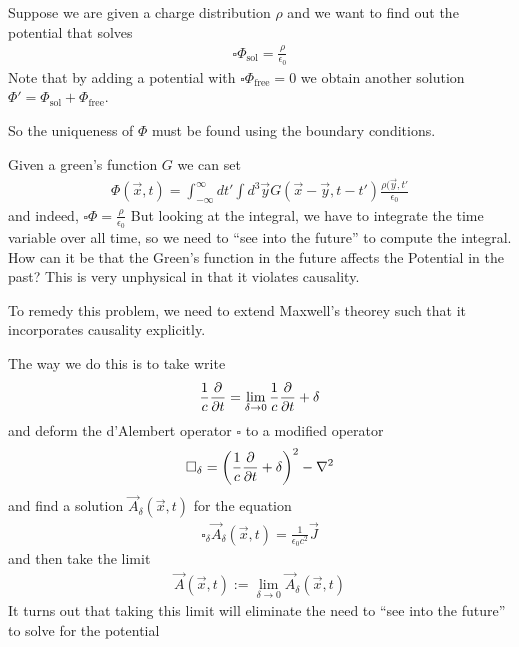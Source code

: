Suppose we are given a charge distribution $\rho$ and we want to find out the potential that solves
\begin{align*}
  \square \Phi_{\text{sol}} = \frac{\rho}{\epsilon_0}
\end{align*}
Note that by adding a potential with $\square \Phi_{\text{free}} = 0$
we obtain another solution $\Phi' = \Phi_{\text{sol}} + \Phi_{\text{free}}$.

So the uniqueness of $\Phi$ must be found using the boundary conditions.

Given a green's function $G$ we can set
\begin{align*}
  \Phi(\vec{x},t) = 
  \int_{-\infty}^{\infty}
  dt' \int d^{3}\vec{y}G(\vec{x} -\vec{y}, t - t') \frac{\rho(\vec{y},t'}{\epsilon_0}
\end{align*}
and indeed, $\square \Phi = \frac{\rho}{\epsilon_0}$ 
But looking at the integral, we have to integrate the time variable over all time, so we need to ``see into the future'' to compute the integral.
How can it be that the Green's function in the future affects the Potential in the past?
This is very unphysical in that it violates causality.

To remedy this problem, we need to extend Maxwell's theorey such that it incorporates causality explicitly.

The way we do this is to take write
\begin{align*}
  \frac{1}{c} \frac{\partial }{\partial t} = \lim_{\delta \to 0}\frac{1}{c} \frac{\partial }{\partial t} + \delta
\end{align*}
and deform the d'Alembert operator $\square$ to a modified operator
\begin{align*}
  \square_{\delta} = \left(
    \frac{1}{c}\frac{\partial }{\partial t} + \delta
  \right)^{2}
  - \nabla^{2}
\end{align*}
and find a solution $\vec{A}_{\delta}(\vec{x},t)$ for the equation
\begin{align*}
  \square_{\delta}\vec{A}_{\delta}(\vec{x},t) = \frac{1}{\epsilon_0 c^{2}} \vec{J}
\end{align*}
and then take the limit
\begin{align*}
  \vec{A}(\vec{x},t) := \lim_{\delta \to 0} \vec{A}_{\delta}(\vec{x},t)
\end{align*}
It turns out that taking this limit will eliminate the need to ``see into the future'' to solve for the potential

